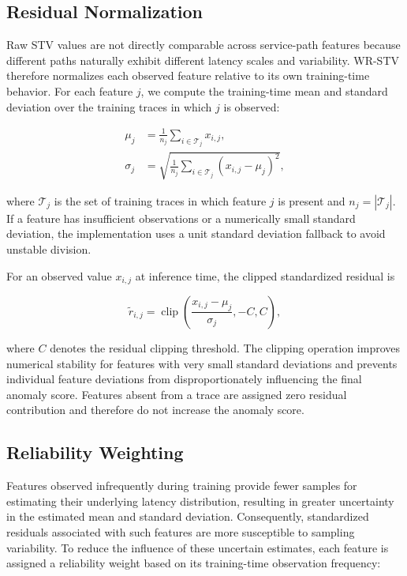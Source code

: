 \subsection{Residual Normalization}

Raw STV values are not directly comparable across service-path features
because different paths naturally exhibit different latency scales and
variability. WR-STV therefore normalizes each observed feature relative
to its own training-time behavior. For each feature \(j\), we compute
the training-time mean and standard deviation over the training traces in
which \(j\) is observed:

\begin{align}
\mu_j
&=
\frac{1}{n_j}
\sum_{i \in \mathcal{T}_j}
x_{i,j},
\label{eq:mean}
\\
\sigma_j
&=
\sqrt{
\frac{1}{n_j}
\sum_{i \in \mathcal{T}_j}
(x_{i,j} - \mu_j)^2
},
\label{eq:std}
\end{align}

\noindent where \(\mathcal{T}_j\) is the set of training traces in which
feature \(j\) is present and \(n_j = |\mathcal{T}_j|\). If a feature has
insufficient observations or a numerically small standard deviation, the
implementation uses a unit standard deviation fallback to avoid unstable
division.

For an observed value \(x_{i,j}\) at inference time, the clipped
standardized residual is

\begin{equation}
\tilde{r}_{i,j}
=
\operatorname{clip}
\left(
\frac{x_{i,j}-\mu_j}{\sigma_j},
-C,
C
\right),
\label{eq:residual}
\end{equation}

\noindent where \(C\) denotes the residual clipping threshold. The
clipping operation improves numerical stability for features with very
small standard deviations and prevents individual feature deviations from
disproportionately influencing the final anomaly score. Features absent
from a trace are assigned zero residual contribution and therefore do not
increase the anomaly score.

\subsection{Reliability Weighting}

Features observed infrequently during training provide fewer samples for
estimating their underlying latency distribution, resulting in greater
uncertainty in the estimated mean and standard deviation. Consequently,
standardized residuals associated with such features are more susceptible
to sampling variability. To reduce the influence of these uncertain
estimates, each feature is assigned a reliability weight based on its
training-time observation frequency:

